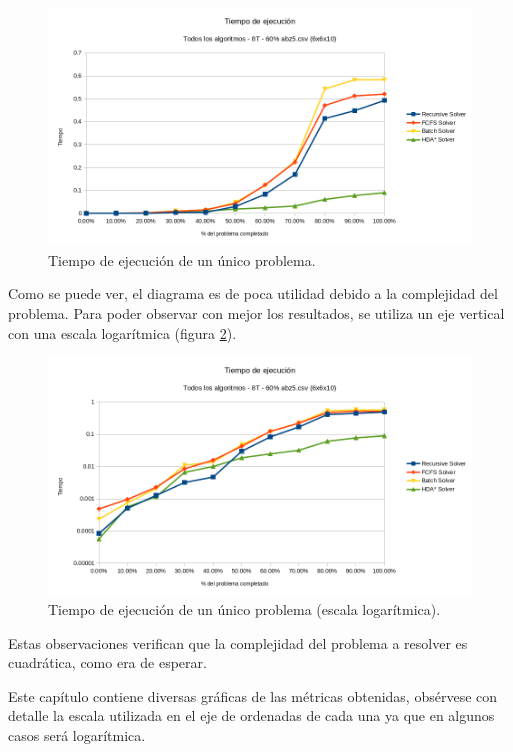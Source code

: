 \begin{figure}[h]
    \centering
    \includegraphics[width=\textwidth]{Media/Ch2/Runtime_One_Problem_Linear.png}
    \caption{Tiempo de ejecución de un único problema.}
    \label{fig:Runtime_One_Problem_Linear}
\end{figure}

Como se puede ver, el diagrama es de poca utilidad debido a la
complejidad del problema.
Para poder observar con mejor los resultados,
se utiliza un eje vertical con una escala logarítmica
(figura \ref{fig:Runtime_One_Problem_Log}).

\begin{figure}[h]
    \centering
    \includegraphics[width=\textwidth]{Media/Ch2/Runtime_One_Problem_Log.png}
    \caption{Tiempo de ejecución de un único problema (escala logarítmica).}
    \label{fig:Runtime_One_Problem_Log}
\end{figure}

Estas observaciones verifican que la complejidad del problema
a resolver es cuadrática, como era de esperar.

\begin{notebox}
    Este capítulo contiene diversas gráficas de las métricas obtenidas,
    obsérvese con detalle la escala utilizada en el eje de ordenadas de cada una
    ya que en algunos casos será logarítmica.
\end{notebox}

